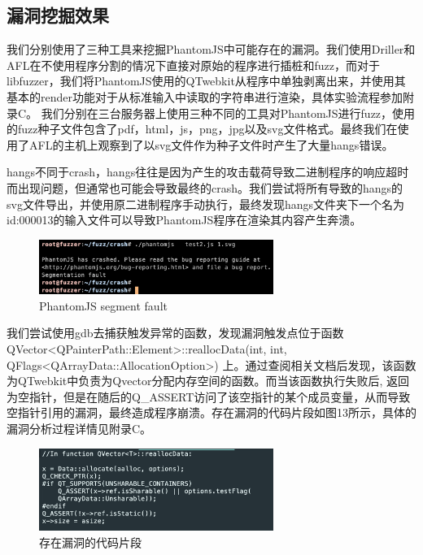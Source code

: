 \documentclass[doctor,privacy,twoside]{buaa_mac}
\begin{document}
\subsection{漏洞挖掘效果}
我们分别使用了三种工具来挖掘PhantomJS中可能存在的漏洞。我们使用Driller和AFL在不使用程序分割的情况下直接对原始的程序进行插桩和fuzz，而对于libfuzzer，我们将PhantomJS使用的QTwebkit从程序中单独剥离出来，并使用其基本的render功能对于从标准输入中读取的字符串进行渲染，具体实验流程参加附录C。 我们分别在三台服务器上使用三种不同的工具对PhantomJS进行fuzz，使用的fuzz种子文件包含了pdf，html，js，png，jpg以及svg文件格式。最终我们在使用了AFL的主机上观察到了以svg文件作为种子文件时产生了大量hangs错误。

hangs不同于crash，hangs往往是因为产生的攻击载荷导致二进制程序的响应超时而出现问题，但通常也可能会导致最终的crash。我们尝试将所有导致的hangs的svg文件导出，并使用原二进制程序手动执行，最终发现hangs文件夹下一个名为 id:000013的输入文件可以导致PhantomJS程序在渲染其内容产生奔溃。

\centerline{}
\begin{figure}[!h]
  \centering
  \includegraphics[width=0.68\textwidth]{images/seg_fault.png}
  \caption{PhantomJS segment fault}
  \label{fig:logo}
\end{figure}
\centerline{}

我们尝试使用gdb去捕获触发异常的函数，发现漏洞触发点位于函数 QVector<QPainterPath::Element>::reallocData(int, int, QFlags<QArrayData::AllocationOption>) 上。通过查阅相关文档后发现，该函数为QTwebkit中负责为Qvector分配内存空间的函数。而当该函数执行失败后, 返回为空指针，但是在随后的Q\_{}ASSERT访问了该空指针的某个成员变量，从而导致空指针引用的漏洞，最终造成程序崩溃。存在漏洞的代码片段如图13所示，具体的漏洞分析过程详情见附录C。


\centerline{}
\begin{figure}[!h]
  \centering
  \includegraphics[width=0.68\textwidth]{images/vuln_func.png}
  \caption{存在漏洞的代码片段}
  \label{fig:logo}
\end{figure}
\centerline{}
\end{document}
